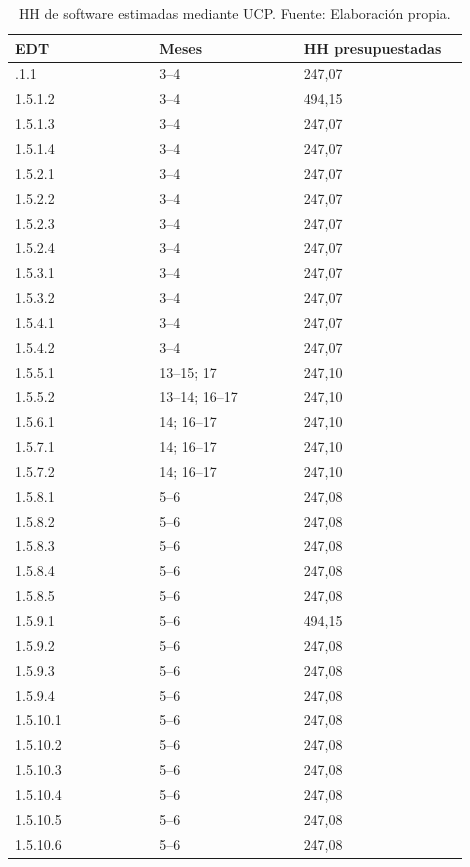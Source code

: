 \documentclass[11pt]{article}
\begin{document}
\begingroup
\small
\begin{longtable}{@{}p{0.29\linewidth}p{0.29\linewidth}p{0.32\linewidth}@{}}
\caption[HH de software estimadas mediante UCP]{HH de software estimadas mediante UCP. Fuente: Elaboración propia.}\label{tab:t15-tareas-5}\\
\toprule
\textbf{EDT} & \textbf{Meses} & \textbf{HH presupuestadas} \\
\midrule
\endhead
\bottomrule
\endlastfoot
1.5.1.1 & 3--4 & 247,07 \\
1.5.1.2 & 3--4 & 494,15 \\
1.5.1.3 & 3--4 & 247,07 \\
1.5.1.4 & 3--4 & 247,07 \\
1.5.2.1 & 3--4 & 247,07 \\
1.5.2.2 & 3--4 & 247,07 \\
1.5.2.3 & 3--4 & 247,07 \\
1.5.2.4 & 3--4 & 247,07 \\
1.5.3.1 & 3--4 & 247,07 \\
1.5.3.2 & 3--4 & 247,07 \\
1.5.4.1 & 3--4 & 247,07 \\
1.5.4.2 & 3--4 & 247,07 \\
1.5.5.1 & 13--15; 17 & 247,10 \\
1.5.5.2 & 13--14; 16--17 & 247,10 \\
1.5.6.1 & 14; 16--17 & 247,10 \\
1.5.7.1 & 14; 16--17 & 247,10 \\
1.5.7.2 & 14; 16--17 & 247,10 \\
1.5.8.1 & 5--6 & 247,08 \\
1.5.8.2 & 5--6 & 247,08 \\
1.5.8.3 & 5--6 & 247,08 \\
1.5.8.4 & 5--6 & 247,08 \\
1.5.8.5 & 5--6 & 247,08 \\
1.5.9.1 & 5--6 & 494,15 \\
1.5.9.2 & 5--6 & 247,08 \\
1.5.9.3 & 5--6 & 247,08 \\
1.5.9.4 & 5--6 & 247,08 \\
1.5.10.1 & 5--6 & 247,08 \\
1.5.10.2 & 5--6 & 247,08 \\
1.5.10.3 & 5--6 & 247,08 \\
1.5.10.4 & 5--6 & 247,08 \\
1.5.10.5 & 5--6 & 247,08 \\
1.5.10.6 & 5--6 & 247,08 \\

\end{longtable}
\end{document}
